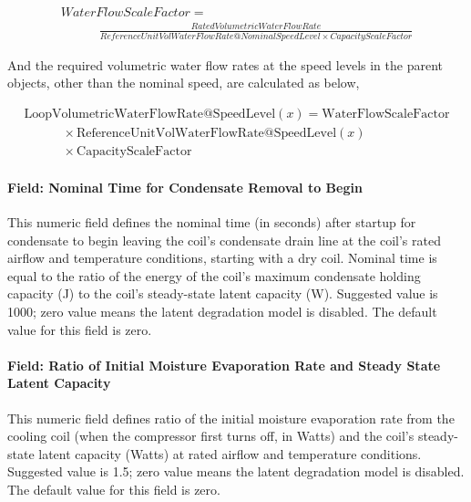 \begin{equation}
  \begin{array}{l}
    WaterFlowScaleFactor = \\
    \quad \quad \quad \frac{{RatedVolumetricWaterFlowRate}}{{ReferenceUnitVolWaterFlowRate@NominalSpeedLevel \times CapacityScaleFactor}}
  \end{array}
\end{equation}

And the required volumetric water flow rates at the speed levels in the parent objects, other than the nominal speed, are calculated as below,

\begin{equation}
  \begin{array}{l}
    \mathrm{LoopVolumetricWaterFlowRate} @ \mathrm{SpeedLevel} \left( x \right) = \mathrm{WaterFlowScaleFactor} \\
    \quad \quad \quad \times \mathrm{ReferenceUnitVolWaterFlowRate} @ \mathrm{SpeedLevel}(x) \\
    \quad \quad \quad  \times \mathrm{CapacityScaleFactor}
  \end{array}
\end{equation}

\paragraph{Field: Nominal Time for Condensate Removal to Begin}\label{field-nominal-time-for-condensate-removal-to-begin-5}

This numeric field defines the nominal time (in seconds) after startup for condensate to begin leaving the coil's condensate drain line at the coil's rated airflow and temperature conditions, starting with a dry coil. Nominal time is equal to the ratio of the energy of the coil's maximum condensate holding capacity (J) to the coil's steady-state latent capacity (W). Suggested value is 1000; zero value means the latent degradation model is disabled. The default value for this field is zero.

\paragraph{Field: Ratio of Initial Moisture Evaporation Rate and Steady State Latent Capacity}\label{field-ratio-of-initial-moisture-evaporation-rate-and-steady-state-latent-capacity-5}

This numeric field defines ratio of the initial moisture evaporation rate from the cooling coil (when the compressor first turns off, in Watts) and the coil's steady-state latent capacity (Watts) at rated airflow and temperature conditions. Suggested value is 1.5; zero value means the latent degradation model is disabled. The default value for this field is zero.

